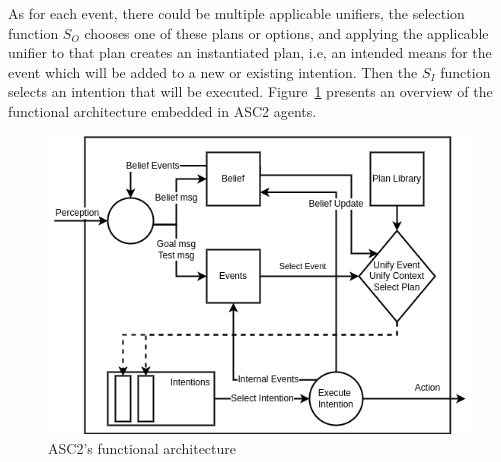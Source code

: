 


As for each event, there could be multiple applicable unifiers, the selection function $S_O$ chooses one of these plans or options, and applying the applicable unifier to that plan creates an instantiated plan, i.e, an intended means for the event which will be added to a new or existing intention. Then the $S_I$ function selects an intention that will be executed. Figure~\ref{fig:asc2func} presents an overview of the functional architecture embedded in ASC2 agents.

\begin{figure}[t!]
  \centering
  \includegraphics[width=0.70\linewidth]{ch_agere/asc2arch.drawio.png}
  \caption{ASC2's functional architecture}
  \label{fig:asc2func}
\end{figure}


